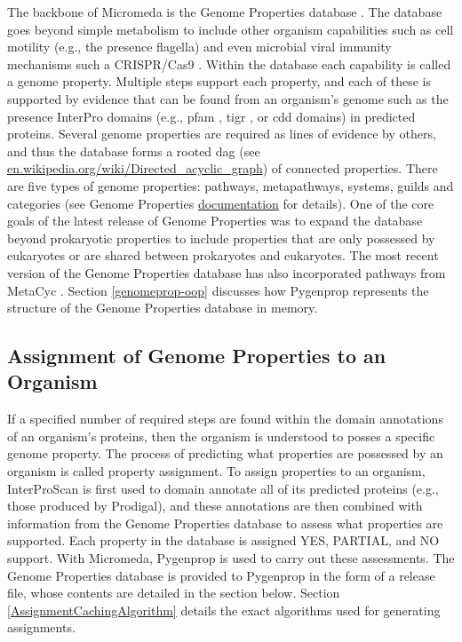 The backbone of Micromeda is the Genome Properties database \cite{Haft2013}. The database goes beyond simple metabolism to include other organism capabilities such as cell motility (e.g., the presence flagella) and even microbial viral immunity mechanisms such a CRISPR/Cas9 \cite{horvath2010crispr}. Within the database each capability is called a genome property. Multiple steps support each property, and each of these is supported by evidence that can be found from an organism's genome such as the presence InterPro domains (e.g., \gls{pfam} \cite{bateman2004pfam}, \gls{tigr} \cite{haft2001tigrfams}, or \gls{cdd} \cite{marchler2014cdd} domains) in predicted proteins. Several genome properties are required as lines of evidence by others, and thus the database forms a rooted \gls{dag} (see \href{http://en.wikipedia.org/wiki/Directed_acyclic_graph}{en.wikipedia.org/wiki/Directed\_acyclic\_graph}) of connected properties. There are five types of genome properties: pathways, metapathways, systems, guilds and categories (see Genome Properties \href{https://genome-properties.readthedocs.io/en/latest/flatfile.html#genome-property-types}{documentation} for details). One of the core goals of the latest release of Genome Properties was to expand the database beyond prokaryotic properties to include properties that are only possessed by eukaryotes or are shared between prokaryotes and eukaryotes. The most recent version of the Genome Properties database has also incorporated pathways from MetaCyc \cite{karp2002metacyc}. Section \ref{genomeprop-oop} discusses how Pygenprop represents the structure of the Genome Properties database in memory.

\subsection{Assignment of Genome Properties to an Organism}

If a specified number of required steps are found within the domain annotations of an organism's proteins, then the organism is understood to posses a specific genome property. The process of predicting what properties are possessed by an organism is called property assignment. To assign properties to an organism, InterProScan is first used to domain annotate all of its predicted proteins (e.g., those produced by Prodigal), and these annotations are then combined with information from the Genome Properties database to assess what properties are supported. Each property in the database is assigned YES, PARTIAL, and NO support. With Micromeda, Pygenprop is used to carry out these assessments. The Genome Properties database is provided to Pygenprop in the form of a release file, whose contents are detailed in the section below. Section \ref{AssignmentCachingAlgorithm} details the exact algorithms used for generating assignments.  

